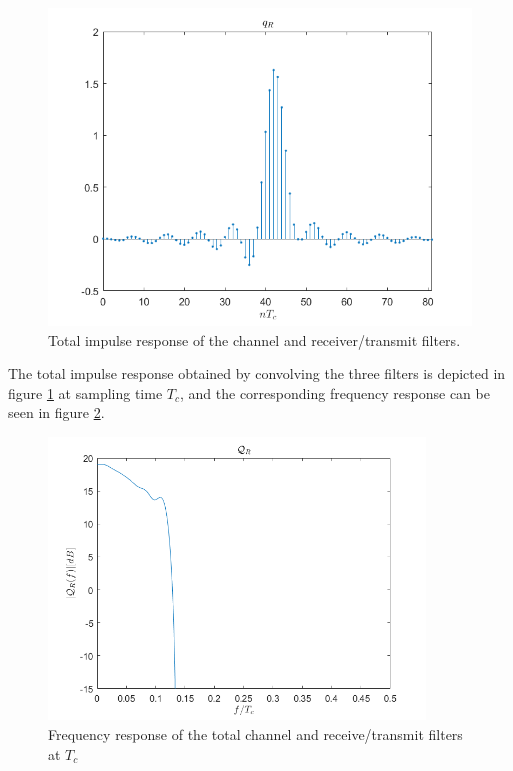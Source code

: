 \documentclass[a4paper,11.5pt]{article}
\begin{document}
\begin{figure}[H]
	\begin{center}   
		\includegraphics[width=\textwidth]{figs/q_R.png} 
		\caption{Total impulse response of the channel and receiver/transmit filters.}
		\label{fig:q_R}
	\end{center}
\end{figure}

The total impulse response obtained by convolving the three filters is depicted in figure \ref{fig:q_R} at sampling time $T_c$, and the corresponding frequency response can be seen in figure \ref{fig:Qmag_R}.

\begin{figure}[H]
	\begin{center}   
		\includegraphics[width=10cm]{figs/Qmag_R.png} 
		\caption{Frequency response of the total channel and receive/transmit filters at $T_c$}
		\label{fig:Qmag_R}
	\end{center}
\end{figure}
\end{document}
